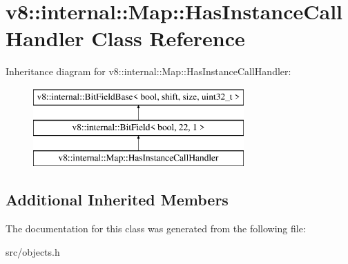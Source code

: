 \hypertarget{classv8_1_1internal_1_1_map_1_1_has_instance_call_handler}{}\section{v8\+:\+:internal\+:\+:Map\+:\+:Has\+Instance\+Call\+Handler Class Reference}
\label{classv8_1_1internal_1_1_map_1_1_has_instance_call_handler}
Inheritance diagram for v8\+:\+:internal\+:\+:Map\+:\+:Has\+Instance\+Call\+Handler\+:\begin{figure}[H]
\begin{center}
\leavevmode
\includegraphics[height=3.000000cm]{classv8_1_1internal_1_1_map_1_1_has_instance_call_handler}
\end{center}
\end{figure}
\subsection*{Additional Inherited Members}


The documentation for this class was generated from the following file\+:\begin{DoxyCompactItemize}
\item 
src/objects.\+h\end{DoxyCompactItemize}
